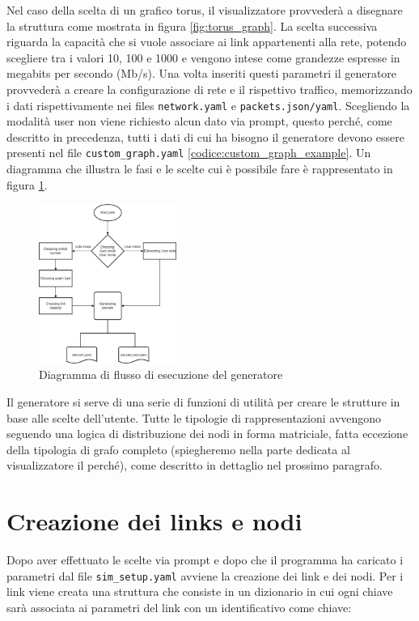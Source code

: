 \documentclass[binding=0.6cm]{sapthesis}
\begin{document}
Nel caso della scelta di un grafico torus, il visualizzatore provvederà a disegnare la struttura come mostrata in figura \ref{fig:torus_graph}.
La scelta successiva riguarda la capacità che si vuole associare ai link appartenenti alla rete, potendo
scegliere tra i valori 10, 100 e 1000 e vengono intese come grandezze espresse in megabits per secondo (Mb/s).
Una volta inseriti questi parametri il generatore provvederà a creare la configurazione di rete e il rispettivo traffico, memorizzando i dati rispettivamente
nei files \texttt{network.yaml} e \texttt{packets.json/yaml}.
Scegliendo la modalità user non viene richiesto alcun dato via prompt, questo perché, come descritto in precedenza, tutti i dati di cui ha bisogno
il generatore devono essere presenti nel file \texttt{custom\_graph.yaml} \ref{codice:custom_graph_example}. Un diagramma che illustra le fasi e le
 scelte cui è possibile fare
è rappresentato in figura \ref{fig:diagramma_generatore}.   
\begin{figure}[h]
    \centering
    \includegraphics[width=0.40\textwidth]{immagini/diagramma_selezioni_config_gen.jpg}
    \caption{Diagramma di flusso di esecuzione del generatore}
    \label{fig:diagramma_generatore}
\end{figure}


Il generatore si serve di una serie di funzioni di utilità per creare le strutture in base alle scelte dell'utente. 
Tutte le tipologie di rappresentazioni avvengono seguendo una logica di distribuzione dei nodi in forma matriciale, fatta eccezione della tipologia di
grafo completo (spiegheremo nella parte dedicata al visualizzatore il perché), come descritto in dettaglio nel prossimo paragrafo.


\section{Creazione dei links e nodi}
\label{sec:creazione_links_nodi}
Dopo aver effettuato le scelte via prompt e dopo che il programma ha caricato i parametri dal file \texttt{sim\_setup.yaml} 
avviene la creazione dei link e dei nodi. Per i link viene creata una struttura che consiste in un dizionario in cui ogni chiave sarà associata
ai parametri del link con un identificativo come chiave:
\end{document}
